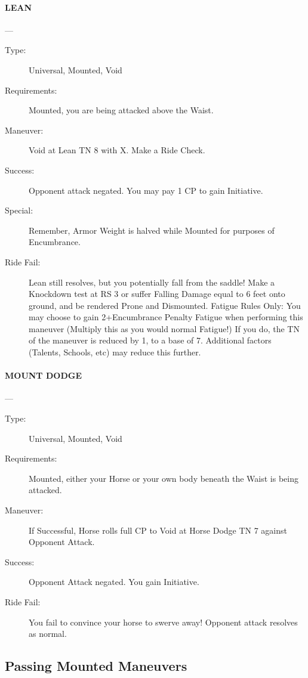 \documentclass[oneside,11pt,english]{book}
\begin{document}
\paragraph{\large\label{man:LEAN} LEAN}---
\vspace{-10pt}\begin{description} 
\item [Type:] Universal, Mounted, Void 
\item [Requirements:] Mounted, you are being attacked above the Waist. 
\item [Maneuver:] Void at Lean TN 8 with X. Make a Ride Check. 
\item [Success:] Opponent attack negated. You may pay 1 CP to gain Initiative. 
\item [Special:] Remember, Armor Weight is halved while Mounted for purposes of Encumbrance. 
\item [Ride Fail:] Lean still resolves, but you potentially fall from the saddle! Make a Knockdown test at RS 3 
or suffer Falling Damage equal to 6 feet onto ground, and be rendered Prone and Dismounted.
Fatigue Rules Only: You may choose to gain 2+Encumbrance Penalty Fatigue when performing this 
maneuver (Multiply this as you would normal Fatigue!) If you do, the TN of the maneuver is reduced by 
1, to a base of 7. Additional factors (Talents, Schools, etc) may reduce this further.
\end{description}
\paragraph{\large\label{man:MOUNT DODGE} MOUNT DODGE}---
\vspace{-10pt}\begin{description} 
\item [Type:] Universal, Mounted, Void 
\item [Requirements:] Mounted, either your Horse or your own body beneath the Waist is being attacked. 
\item [Maneuver:] If Successful, Horse rolls full CP to Void at Horse Dodge TN 7 against Opponent Attack. 
\item [Success:] Opponent Attack negated. You gain Initiative. 
\item [Ride Fail:] You fail to convince your horse to swerve away! Opponent attack resolves as normal.
\end{description}
\subsection{Passing Mounted Maneuvers}
\end{document}
